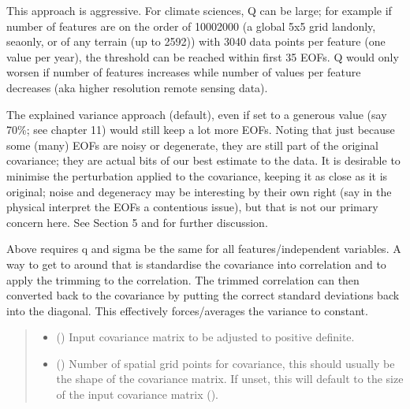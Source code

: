 \documentclass[letterpaper,10pt,english]{sphinxmanual}
\begin{document}
\begin{fulllineitems}
\sphinxAtStartPar
This approach is aggressive. For climate sciences, Q can be
large; for example if number of features are on the order of 1000\sphinxhyphen{}2000 (a
global 5x5 grid land\sphinxhyphen{}only, sea\sphinxhyphen{}only, or of any terrain (up to 2592)) with
30\sphinxhyphen{}40 data points per feature (one value per year), the threshold can be
reached within first 3\sphinxhyphen{}5 EOFs. Q would only worsen if number of features
increases while number of values per feature decreases (aka higher
resolution remote sensing data).

\sphinxAtStartPar
The explained variance approach (default), even if set to a generous
value (say 70\%; see  chapter 11) would still keep a lot more EOFs.
Noting that just because some (many) EOFs are noisy or degenerate, they are
still part of the original covariance; they are actual bits of our best
estimate to the data. It is desirable to minimise the perturbation applied
to the covariance, keeping it as close as it is original; noise and
degeneracy may be interesting by their own right (say in the physical
interpret the EOFs \textendash{} a contentious issue), but that is not our
primary concern here. See  Section 5 and 
for further discussion.

\sphinxAtStartPar
Above requires q and sigma be the same for all features/independent
variables. A way to get to around that is standardise the covariance into
correlation and to apply the trimming to the correlation. The trimmed
correlation can then converted back to the covariance by putting the
correct standard deviations back into the diagonal. This effectively
forces/averages the variance to constant.
\begin{quote}\begin{description}
\begin{itemize}
\item {}
\sphinxAtStartPar
{} () \textendash{} Input covariance matrix to be adjusted to positive definite.

\item {}
\sphinxAtStartPar
{} (\sphinxstyleliteralemphasis{\sphinxupquote{ | }}) \textendash{} Number of spatial grid points for covariance, this should usually be the
shape of the covariance matrix. If unset, this will default to the size
of the input covariance matrix ().


\end{itemize}
\end{description}
\end{quote}
\end{fulllineitems}
\end{document}
